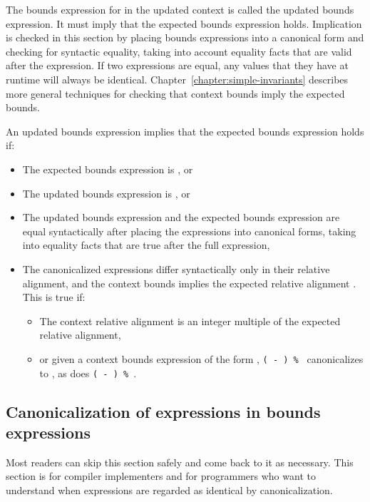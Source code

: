 The bounds expression for  in the updated context
is called the updated bounds expression.  It must imply that the
expected bounds expression holds. Implication is checked in this section
by placing bounds expressions into a canonical form and
checking for syntactic equality, taking into account equality
facts that are valid after the expression. If two expressions 
are equal, any values that they have at runtime will always be
identical. Chapter~\ref{chapter:simple-invariants}
describes more general techniques for checking
that context bounds imply the expected bounds.

An updated bounds expression implies that the expected bounds
expression holds if:

\begin{itemize}
\item
  The expected bounds expression is \boundsunknown, or
\item
  The updated bounds expression is \boundsany, or
\item
  The updated bounds expression and the expected bounds expression are
  equal syntactically after placing the expressions into canonical
  forms, taking into equality facts that are true after the full
  expression,
\item
  The canonicalized expressions
  differ syntactically only in their relative alignment, and
  the context bounds implies the expected relative alignment .
  This is true if:

  \begin{itemize}
  \item
    The context relative alignment is an integer multiple of the
    expected relative alignment,
  \item
   or given a context bounds expression of the form
   ,
   \texttt{( - ) \% }
   canonicalizes to , as does
   \texttt{( - ) \% }.
  \end{itemize}
\end{itemize}


\subsection{Canonicalization of expressions in bounds expressions}
\label{section:canonicalization}

Most readers can skip this section safely and come back to it as
necessary. This section is for compiler implementers and for programmers
who want to understand when expressions are regarded as identical by
canonicalization.

